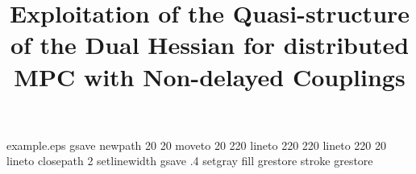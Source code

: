 %
%
%
%
%
\begin{filecontents*}{example.eps}
gsave
newpath
  20 20 moveto
  20 220 lineto
  220 220 lineto
  220 20 lineto
closepath
2 setlinewidth
gsave
  .4 setgray fill
grestore
stroke
grestore
\end{filecontents*}
%
\RequirePackage{fix-cm}
%
\documentclass[smallextended]{svjour3}       %
%
\smartqed  %
%
\usepackage{graphicx}
\usepackage{amsmath}              
  {
      \newtheorem{assumption}{Assumption}
  }
\usepackage{amssymb}
\usepackage{graphicx}
\usepackage{caption}
\usepackage{subcaption}

\usepackage{color}
\newcommand{\Seb}[1]{
\begin{center}
\fcolorbox{seb}{seb}{\parbox[t]{0.45\textwidth}{\textbf{Seb:} #1}}
\end{center}}

%
%
%
%
%


\title{Exploitation of the Quasi-structure of the Dual Hessian for distributed MPC with Non-delayed Couplings%
}

